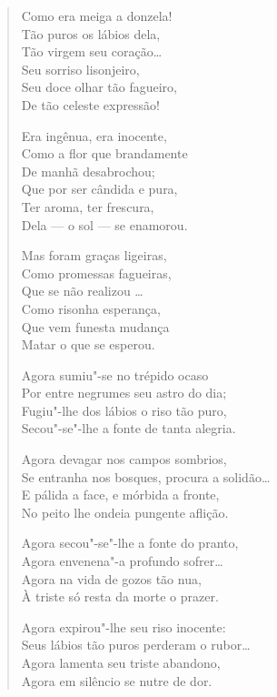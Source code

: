 \begin{verse}
Como era meiga a donzela!\\
Tão puros os lábios dela,\\
Tão virgem seu coração\ldots{}\\
Seu sorriso lisonjeiro,\\
Seu doce olhar tão fagueiro,\\
De tão celeste expressão!

Era ingênua, era inocente,\\
Como a flor que brandamente\\
De manhã desabrochou;\\
Que por ser cândida e pura,\\
Ter aroma, ter frescura,\\
Dela --- o sol --- se enamorou.

Mas foram graças ligeiras,\\
Como promessas fagueiras,\\
Que se não realizou \ldots{}\\
Como risonha esperança,\\
Que vem funesta mudança\\
Matar o que se esperou.

\pagebreak

Agora sumiu"-se no trépido ocaso\\
Por entre negrumes seu astro do dia;\\
Fugiu"-lhe dos lábios o riso tão puro,\\
Secou"-se"-lhe a fonte de tanta alegria.

Agora devagar nos campos sombrios,\\
Se entranha nos bosques, procura a solidão\ldots{}\\
E pálida a face, e mórbida a fronte,\\
No peito lhe ondeia pungente aflição.

Agora secou"-se"-lhe a fonte do pranto,\\
Agora envenena"-a profundo sofrer\ldots{}\\
Agora na vida de gozos tão nua,\\
À triste só resta da morte o prazer.

Agora expirou"-lhe seu riso inocente:\\
Seus lábios tão puros perderam o rubor\ldots{}\\
Agora lamenta seu triste abandono,\\
Agora em silêncio se nutre de dor.


\end{verse}
